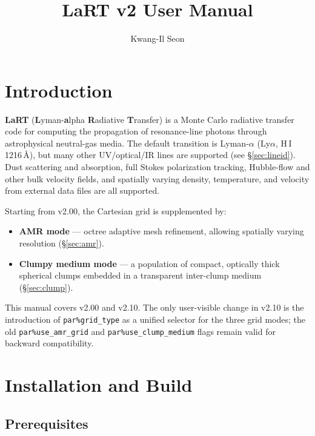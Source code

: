 \documentclass[english,a4paper]{my_memo}
\title{LaRT v2 User Manual}
\author{Kwang-Il Seon}
\date{\docmoddate}
\newcommand{\parm}[1]{\texttt{par\%#1}}
\newcommand{\ion}[2]{#1\,{\scriptsize #2}}
\begin{document}
\maketitle
\tableofcontents
\bigskip

\section{Introduction}

\textbf{LaRT} (\textbf{L}yman-\textbf{a}lpha \textbf{R}adiative \textbf{T}ransfer) is a Monte Carlo
radiative transfer code for computing the propagation of resonance-line photons through
astrophysical neutral-gas media.  The default transition is Lyman-$\alpha$ (Ly$\alpha$,
\ion{H}{I} 1216\,\AA), but many other UV/optical/IR lines are supported
(see \S\ref{sec:lineid}).  Dust scattering and absorption, full Stokes polarization
tracking, Hubble-flow and other bulk velocity fields, and spatially varying density,
temperature, and velocity from external data files are all supported.

Starting from v2.00, the Cartesian grid is supplemented by:
\begin{itemize}
  \item \textbf{AMR mode} — octree adaptive mesh refinement, allowing spatially varying
        resolution (\S\ref{sec:amr}).
  \item \textbf{Clumpy medium mode} — a population of compact, optically thick spherical
        clumps embedded in a transparent inter-clump medium (\S\ref{sec:clump}).
\end{itemize}

This manual covers v2.00 and v2.10.  The only user-visible change in v2.10 is the
introduction of \parm{grid\_type} as a unified selector for the three grid modes;
the old \parm{use\_amr\_grid} and \parm{use\_clump\_medium} flags remain valid for
backward compatibility.

\section{Installation and Build}

\subsection{Prerequisites}
\end{document}
